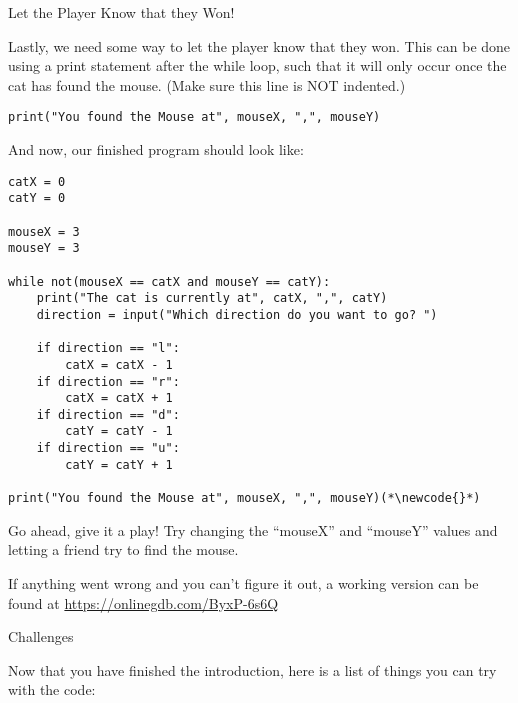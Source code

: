 \documentclass[12pt,oneside]{article}
\newcommand{\q}[1]{``#1''}
\newcommand{\subsectitle}[1]{
  \begin{flushleft}{\large#1}\end{flushleft}
}
\newcommand{\sectitle}[1]{
  \newpage
  \begin{flushleft}{\Large#1}\end{flushleft}
}
\newcommand{\newcode}[0]{\hfill<--}
\begin{document}
\begin{minipage}{\textwidth}
\subsectitle{Let the Player Know that they Won!}

Lastly, we need some way to let the player know that they won. This can be done using a print statement after the while loop, such that it will only occur once the cat has found the mouse. (Make sure this line is NOT indented.)

\begin{lstlisting}
print("You found the Mouse at", mouseX, ",", mouseY)
\end{lstlisting}

And now, our finished program should look like:

\begin{lstlisting}
catX = 0
catY = 0

mouseX = 3
mouseY = 3

while not(mouseX == catX and mouseY == catY):
    print("The cat is currently at", catX, ",", catY)
    direction = input("Which direction do you want to go? ")
    
    if direction == "l":
        catX = catX - 1
    if direction == "r":
        catX = catX + 1
    if direction == "d":
        catY = catY - 1
    if direction == "u":
        catY = catY + 1

print("You found the Mouse at", mouseX, ",", mouseY)(*\newcode{}*)
\end{lstlisting}

Go ahead, give it a play! Try changing the \q{mouseX} and \q{mouseY} values and letting a friend try to find the mouse. 

If anything went wrong and you can't figure it out, a working version can be found at \url{https://onlinegdb.com/ByxP-6s6Q}

\end{minipage}

\sectitle{Challenges}

Now that you have finished the introduction, here is a list of things you can try with the code:
\end{document}
